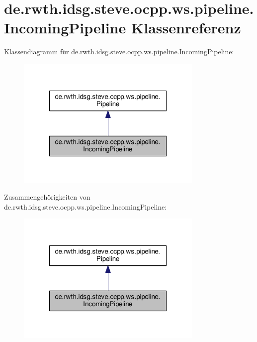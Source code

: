 \hypertarget{classde_1_1rwth_1_1idsg_1_1steve_1_1ocpp_1_1ws_1_1pipeline_1_1_incoming_pipeline}{\section{de.\-rwth.\-idsg.\-steve.\-ocpp.\-ws.\-pipeline.\-Incoming\-Pipeline Klassenreferenz}
\label{classde_1_1rwth_1_1idsg_1_1steve_1_1ocpp_1_1ws_1_1pipeline_1_1_incoming_pipeline}
}


Klassendiagramm für de.\-rwth.\-idsg.\-steve.\-ocpp.\-ws.\-pipeline.\-Incoming\-Pipeline\-:
\nopagebreak
\begin{figure}[H]
\begin{center}
\leavevmode
\includegraphics[width=254pt]{classde_1_1rwth_1_1idsg_1_1steve_1_1ocpp_1_1ws_1_1pipeline_1_1_incoming_pipeline__inherit__graph}
\end{center}
\end{figure}


Zusammengehörigkeiten von de.\-rwth.\-idsg.\-steve.\-ocpp.\-ws.\-pipeline.\-Incoming\-Pipeline\-:
\nopagebreak
\begin{figure}[H]
\begin{center}
\leavevmode
\includegraphics[width=254pt]{classde_1_1rwth_1_1idsg_1_1steve_1_1ocpp_1_1ws_1_1pipeline_1_1_incoming_pipeline__coll__graph}
\end{center}
\end{figure}
